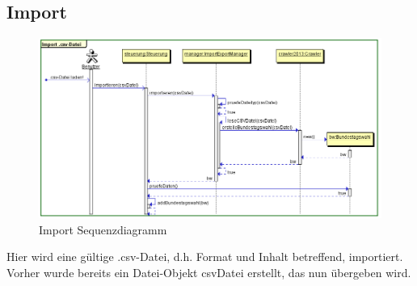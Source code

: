 \documentclass[12pt,a4paper,titlepage]{article}
\begin{document}
\subsection{Import}
\begin{figure}[!ht]
\centering
\includegraphics[scale=0.5]{Sequenzdiagramme/Import_Sequenzdiagramm.png} \caption{Import Sequenzdiagramm} 
\end{figure}
Hier wird eine gültige .csv-Datei, d.h. Format und Inhalt betreffend, importiert. Vorher wurde bereits ein Datei-Objekt csvDatei erstellt, das nun übergeben wird.

\newpage
\end{document}
